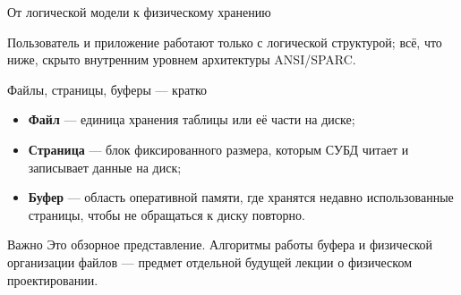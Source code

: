 \documentclass[aspectratio=169]{beamer}
\begin{document}

\begin{frame}{От логической модели к физическому хранению}

\begin{center}
\end{center}

\footnotesize
Пользователь и приложение работают только с логической
структурой; всё, что ниже, скрыто внутренним уровнем
архитектуры ANSI/SPARC.

\end{frame}


\begin{frame}{Файлы, страницы, буферы — кратко}

\begin{itemize}
  \item \textbf{Файл} — единица хранения таблицы или её части
        на диске;
  \item \textbf{Страница} — блок фиксированного размера,
        которым СУБД читает и записывает данные на диск;
  \item \textbf{Буфер} — область оперативной памяти,
        где хранятся недавно использованные страницы,
        чтобы не обращаться к диску повторно.
\end{itemize}

\vspace{0.3cm}

\begin{alertblock}{Важно}
Это обзорное представление. Алгоритмы работы буфера
и физической организации файлов — предмет отдельной
будущей лекции о физическом проектировании.
\end{alertblock}

\end{frame}
\end{document}
